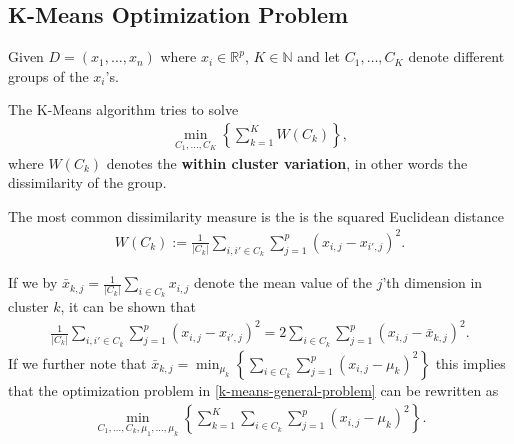 \documentclass[aspectratio=169,10pt]{beamer}
\begin{document}
\subsection{K-Means Optimization Problem}
\begin{frame}{\secname}{\subsecname}
  Given $D = (x_1, \ldots, x_n)$ where $x_i \in \mathbb{R}^p$, $K \in \mathbb{N}$ and let $C_1, \ldots, C_K$ denote different groups of the $x_i$'s.
  
  The K-Means algorithm tries to solve
  \begin{align}
    \min_{C_1, \ldots, C_K} \left\{\sum_{k=1}^K W(C_k)\right\}, \label{k-means-general-problem}
  \end{align}
  where $W(C_k)$ denotes the \textbf{within cluster variation}, in other words the dissimilarity of the group.
  \vspace{10pt}
  
  {\small The most common dissimilarity measure is the is the squared Euclidean distance
  \begin{align}
    W(C_k) := \frac{1}{|C_k|} \sum_{i,i' \in C_k} \sum_{j = 1}^p (x_{i,j} - x_{i',j})^2.
  \end{align}}
\end{frame}

\begin{frame}{\secname}{\subsecname}
  If we by $\bar{x}_{k,j} = \frac{1}{|C_k|}\sum_{i \in C_k} x_{i,j}$ denote the mean value of the $j$'th dimension in cluster $k$, it can be shown that
  \begin{align}
    \frac{1}{|C_k|} \sum_{i,i' \in C_k} \sum_{j = 1}^p (x_{i,j} - x_{i',j})^2 = 2 \sum_{i \in C_k} \sum_{j = 1}^p (x_{i,j} - \bar{x}_{k,j})^2.
  \end{align}
  If we further note that $\bar{x}_{k,j} = \min_{\mu_k} \left\{ \sum_{i \in C_k} \sum_{j = 1}^p (x_{i,j} - \mu_k)^2\right\}$ this implies that the optimization problem in \eqref{k-means-general-problem} can be rewritten as
  \begin{align}
    \min_{C_1, \ldots, C_k, \mu_1, \ldots, \mu_k} \left\{ \sum_{k = 1}^K \sum_{i \in C_k} \sum_{j = 1}^p (x_{i,j} - \mu_k)^2 \right\}.
  \end{align}
\end{frame}
\end{document}
